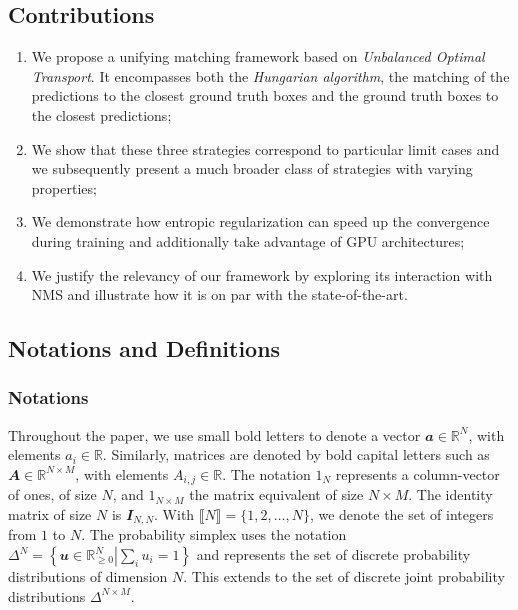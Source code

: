 \subsection{Contributions}
\begin{enumerate}
    \item We propose a unifying matching framework based on \emph{Unbalanced Optimal Transport}. It encompasses both the \emph{Hungarian algorithm}, the matching of the predictions to the closest ground truth boxes and the ground truth boxes to the closest predictions;
    \item We show that these three strategies correspond to particular limit cases and we subsequently present a much broader class of strategies with varying properties;
    \item We demonstrate how entropic regularization can speed up the convergence during training and additionally take advantage of GPU architectures;
    \item We justify the relevancy of our framework by exploring its interaction with NMS and illustrate how it is on par with the state-of-the-art.
\end{enumerate}

\subsection{Notations and Definitions}
\subsubsection{Notations} Throughout the paper, we use small bold letters to denote a vector $\mathbfit{a} \in \mathbb{R}^N$, with elements $a_i \in \mathbb{R}$. Similarly, matrices are denoted by bold capital letters such as $\mathbfit{A} \in \mathbb{R}^{N \times M}$, with elements $A_{i,j} \in \mathbb{R}$. The notation $\mathbfit{1}_N$ represents a column-vector of ones, of size $N$, and $\mathbfit{1}_{N \times M}$ the matrix equivalent of size $N \times M$. The identity matrix of size $N$ is $\mathbfit{I}_{N,N}$. With $\llbracket N \rrbracket = \{1,2,\ldots,N\}$, we denote the set of integers from $1$ to $N$. The probability simplex uses the notation $\Delta^N = \left.\left\{ \mathbfit{u} \in \mathbb{R}_{\geq 0}^N \right| \sum_i u_i = 1\right\}$ and represents the set of discrete probability distributions of dimension $N$. This extends to the set of discrete joint probability distributions $\Delta^{N \times M}$.

